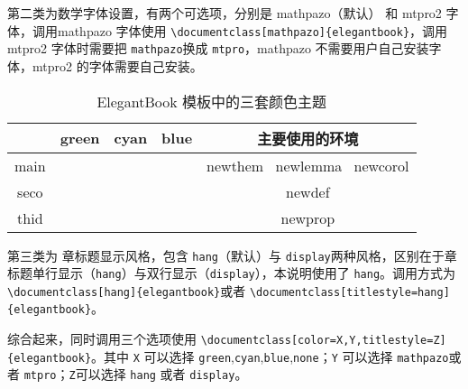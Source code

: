 \documentclass[color=green,mathpazo,titlestyle=hang,11pt]{elegantbook}
\begin{document}
第二类为{\color{main}数学字体}设置，有两个可选项，分别是 mathpazo（默认） 和 mtpro2 字体，调用mathpazo 字体使用 \verb|\documentclass[mathpazo]{elegantbook}|，调用 mtpro2 字体时需要把 \verb|mathpazo|换成 \verb|mtpro|，mathpazo 不需要用户自己安装字体，mtpro2 的字体需要自己安装。

\begin{table}[htp]
\centering
\begin{tabular}{ccccc}
\toprule
	  & green & cyan & blue & 主要使用的环境\\
\midrule
main & \makecell{{\color{main1}\rule{1cm}{1cm}}}& \makecell{{\color{main2}\rule{1cm}{1cm}}}&\makecell{ {\color{main3}\rule{1cm}{1cm}}}& newthem \ newlemma \ newcorol\\

seco &\makecell{ {\color{seco1}\rule{1cm}{1cm}}}& \makecell{{\color{seco2}\rule{1cm}{1cm}}}&\makecell{ {\color{seco3}\rule{1cm}{1cm}}}&newdef\\

thid &\makecell{ {\color{thid1}\rule{1cm}{1cm}}}& \makecell{{\color{thid2}\rule{1cm}{1cm}}}&\makecell{ {\color{thid3}\rule{1cm}{1cm}}}&newprop\\
\bottomrule
\end{tabular}
\caption{ElegantBook 模板中的三套颜色主题\label{tab:color thm}}
\end{table}

第三类为{\color{main} 章标题显示风格}，包含 \verb|hang|（默认）与 \verb|display|两种风格，区别在于章标题单行显示（\verb|hang|）与双行显示（\verb|display|），本说明使用了 \verb|hang|。调用方式为 \verb|\documentclass[hang]{elegantbook}|或者 \verb|\documentclass[titlestyle=hang]{elegantbook}|。

综合起来，同时调用三个选项使用 \verb|\documentclass[color=X,Y,titlestyle=Z]{elegantbook}|。其中 \verb|X| 可以选择 \verb|green|,\verb|cyan|,\verb|blue|,\verb|none|；\verb|Y| 可以选择 \verb|mathpazo|或者 \verb|mtpro|；\verb|Z|可以选择 \verb|hang| 或者 \verb|display|。
\end{document}

